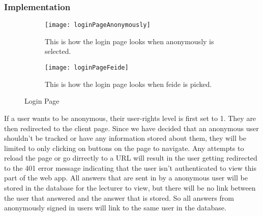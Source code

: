 \subsubsection{Implementation}
\begin{figure}[h]
    \centering
    \begin{subfigure}{0.45\linewidth}
        \texttt{[image: loginPageAnonymously]}
        \caption{This is how the login page looks when anonymously is selected.}
        \label{fig:loginPageAnonoumsly}
    \end{subfigure}
    \begin{subfigure}{0.45\linewidth}
        \texttt{[image: loginPageFeide]}
        \caption{This is how the login page looks when feide is picked.}
        \label{fig:loginPageFeide}
    \end{subfigure}
    \caption{Login Page}
    \label{fig:loginPage}
\end{figure}
\noindent
If a user wants to be anonymous,\cite[][]{VUE:DOC} their user-rights level is first set to 1. They are then redirected to the client page. Since we have decided that an anonymous user shouldn't be tracked or have any information stored about them, they will be limited to only clicking on buttons on the page to navigate. Any attempts to reload the page or go dirrectly to a URL will result in the user getting redirected to the 401 error message indicating that the user isn't authenticated to view this part of the web app. All answers that are sent in by a anonymous user will be stored in the database for the lecturer to view, but there will be no link between the user that answered and the answer that is stored. So all answers from anonymously signed in users will link to the same user in the database.
\\[11pt]
